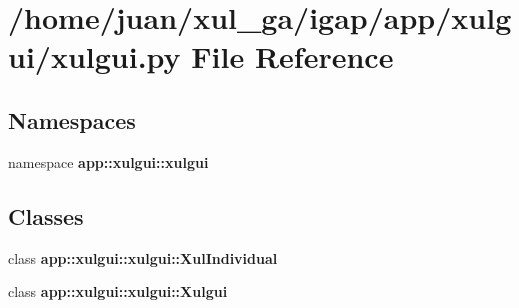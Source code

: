 \section{/home/juan/xul\_\-ga/igap/app/xulgui/xulgui.py File Reference}
\label{xulgui_8py}
\subsection*{Namespaces}
\begin{CompactItemize}
\item 
namespace {\bf app::xulgui::xulgui}
\end{CompactItemize}
\subsection*{Classes}
\begin{CompactItemize}
\item 
class {\bf app::xulgui::xulgui::XulIndividual}
\item 
class {\bf app::xulgui::xulgui::Xulgui}
\end{CompactItemize}
